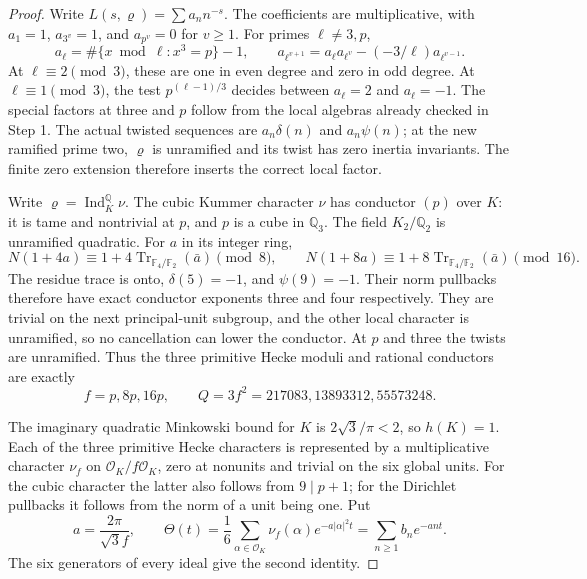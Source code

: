 \begin{proof}
Write $L(s,\varrho)=\sum a_n n^{-s}$.  The coefficients are
multiplicative, with $a_1=1$, $a_{3^v}=1$, and $a_{p^v}=0$
for $v\ge1$.  For primes $\ell\ne3,p$,
\[
 a_\ell=\#\{x\bmod\ell:x^3=p\}-1,\qquad
 a_{\ell^{v+1}}=a_\ell a_{\ell^v}-(-3/\ell)a_{\ell^{v-1}}.
 \tag{C16.20}
\]
At $\ell\equiv2\pmod3$, these are one in even degree and zero
in odd degree.  At $\ell\equiv1\pmod3$, the test
$p^{(\ell-1)/3}$ decides between $a_\ell=2$ and $a_\ell=-1$.
The special factors at three and $p$ follow from the local algebras
already checked in Step 1.  The actual twisted sequences are
$a_n\delta(n)$ and $a_n\psi(n)$; at the new ramified prime two,
$\varrho$ is unramified and its twist has zero inertia invariants.
The finite zero extension therefore inserts the correct local factor.

Write $\varrho=\operatorname{Ind}_{K}^{\mathbb Q}\nu$.
The cubic Kummer character $\nu$ has conductor $(p)$ over $K$:
it is tame and nontrivial at $p$, and $p$ is a cube in $\mathbb Q_3$.
The field $K_2/\mathbb Q_2$ is unramified quadratic.  For $a$ in
its integer ring,
\[
 N(1+4a)\equiv1+4\operatorname{Tr}_{\mathbb F_4/\mathbb F_2}(\bar a)
       \pmod8,\qquad
 N(1+8a)\equiv1+8\operatorname{Tr}_{\mathbb F_4/\mathbb F_2}(\bar a)
       \pmod{16}.
 \tag{C16.21}
\]
The residue trace is onto, $\delta(5)=-1$, and $\psi(9)=-1$.
Their norm pullbacks therefore have exact conductor exponents
three and four respectively.  They are trivial on the next
principal-unit subgroup, and the other local character is
unramified, so no cancellation can lower the conductor.
At $p$ and three the twists are unramified.  Thus the three
primitive Hecke moduli and rational conductors are exactly
\[
 f=p,8p,16p,\qquad
 Q=3f^2=217083,13893312,55573248.
 \tag{C16.22}
\]

The imaginary quadratic Minkowski bound for $K$ is
$2\sqrt3/\pi<2$, so $h(K)=1$.
Each of the three primitive Hecke characters is represented by
a multiplicative character $\nu_f$ on $\mathcal O_K/f\mathcal O_K$,
zero at nonunits and trivial on the six global units.
For the cubic character the latter also follows from
$9\mid p+1$; for the Dirichlet pullbacks it follows from the norm
of a unit being one.  Put
\[
 a=\frac{2\pi}{\sqrt3f},\qquad
 \Theta(t)=\frac16\sum_{\alpha\in\mathcal O_K}
    \nu_f(\alpha)e^{-a|\alpha|^2t}
       =\sum_{n\ge1}b_ne^{-ant}.
 \tag{C16.23}
\]
The six generators of every ideal give the second identity.


\end{proof}
